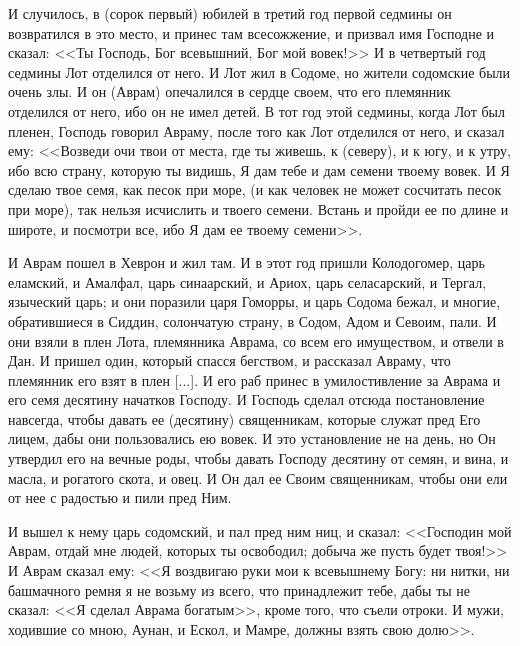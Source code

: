 И случилось, в (сорок первый) юбилей в
третий год первой седмины он возвратился в это
место, и принес там всесожжение, и призвал имя
Господне и сказал: <<Ты Господь, Бог всевышний,
Бог мой вовек!>> И в четвертый год седмины Лот
отделился от него. И Лот жил в Содоме, но жители
содомские были очень злы. И он (Аврам) опечалился
в сердце своем, что его племянник отделился от
него, ибо он не имел детей. В тот год этой седмины,
когда Лот был пленен, Господь говорил Авраму,
после того как Лот отделился от него, и сказал
ему: <<Возведи очи твои от места, где ты живешь, к
(северу), и к югу, и к утру, ибо всю страну,
которую ты видишь, Я дам тебе и дам семени твоему
вовек. И Я сделаю твое семя, как песок при море, (и
как человек не может сосчитать песок при море),
так нельзя исчислить и твоего семени. Встань и
пройди ее по длине и широте, и посмотри все, ибо Я
дам ее твоему семени>>.

И Аврам пошел в Хеврон и жил там. И в этот год
пришли Колодогомер, царь еламский, и Амалфал,
царь синаарский, и Ариох, царь селасарский, и
Тергал, языческий царь; и они поразили царя
Гоморры, и царь Содома бежал, и многие,
обратившиеся в Сиддин, солончатую страну, в
Содом, Адом и Севоим, пали. И они взяли в плен Лота,
племянника Аврама, со всем его имуществом, и
отвели в Дан. И пришел один, который спасся
бегством, и рассказал Авраму, что племянник его
взят в плен [...]. И его раб принес в умилостивление
за Аврама и его семя десятину начатков Господу. И
Господь сделал отсюда постановление навсегда,
чтобы давать ее (десятину) священникам, которые
служат пред Его лицем, дабы они пользовались ею
вовек. И это установление не на день, но Он
утвердил его на вечные роды, чтобы давать Господу
десятину от семян, и вина, и масла, и рогатого
скота, и овец. И Он дал ее Своим священникам, чтобы
они ели от нее с радостью и пили пред Ним.

И вышел к нему царь содомский, и пал пред ним
ниц, и сказал: <<Господин мой Аврам, отдай мне
людей, которых ты освободил; добыча же пусть
будет твоя!>> И Аврам сказал ему: <<Я воздвигаю
руки мои к всевышнему Богу: ни нитки, ни
башмачного ремня я не возьму из всего, что
принадлежит тебе, дабы ты не сказал: <<Я сделал
Аврама богатым>>, кроме того, что съели отроки. И
мужи, ходившие со мною, Аунан, и Ескол, и Мамре,
должны взять свою долю>>.

